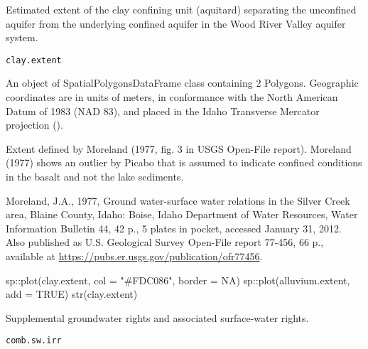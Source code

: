 \documentclass[a4paper]{book}
\begin{document}
%
\begin{Description}\relax
Estimated extent of the clay confining unit (aquitard) separating the
unconfined aquifer from the underlying confined aquifer in the
Wood River Valley aquifer system.
\end{Description}
%
\begin{Usage}
\begin{verbatim}
clay.extent
\end{verbatim}
\end{Usage}
%
\begin{Format}
An object of SpatialPolygonsDataFrame class containing 2 Polygons.
Geographic coordinates are in units of meters, in conformance with the
North American Datum of 1983 (NAD 83), and placed in the
Idaho Transverse Mercator projection ().
\end{Format}
%
\begin{Source}\relax
Extent defined by Moreland (1977, fig. 3 in USGS Open-File report).
Moreland (1977) shows an outlier by Picabo that is assumed to
indicate confined conditions in the basalt and not the lake sediments.
\end{Source}
%
\begin{References}\relax
Moreland, J.A., 1977, Ground water-surface water relations in the Silver Creek area,
Blaine County, Idaho: Boise, Idaho Department of Water Resources, Water Information Bulletin 44,
42 p., 5 plates in pocket, accessed January 31, 2012.
Also published as U.S. Geological Survey Open-File report 77-456, 66 p.,
available at \url{https://pubs.er.usgs.gov/publication/ofr77456}.
\end{References}
%
\begin{Examples}
\begin{ExampleCode}
sp::plot(clay.extent, col = "#FDC086", border = NA)
sp::plot(alluvium.extent, add = TRUE)
str(clay.extent)

\end{ExampleCode}
\end{Examples}
%
\begin{Description}\relax
Supplemental groundwater rights and associated surface-water rights.
\end{Description}
%
\begin{Usage}
\begin{verbatim}
comb.sw.irr
\end{verbatim}
\end{Usage}
\end{document}
